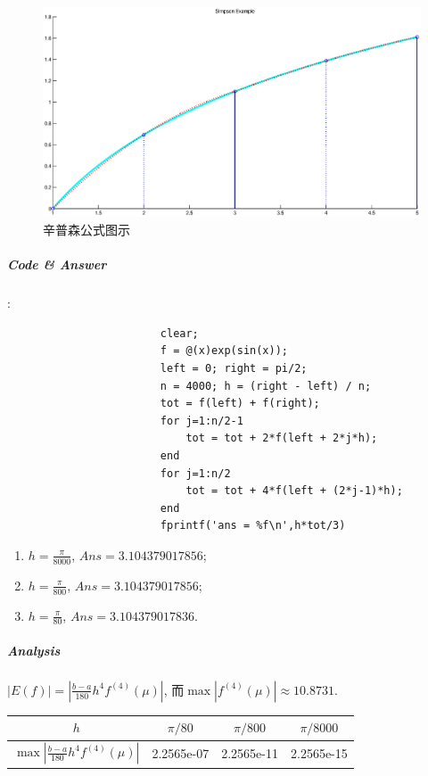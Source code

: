 \documentclass{article}
\begin{document}
\begin{CJK*}{UTF8}{song}
					 \begin{figure}[H]
					 	\centering
					 	\includegraphics[width=1.0\textwidth]{../chapter4_simpson_ts.eps}
					 	\caption{辛普森公式图示}
					 	\label{img_chapter4_simpson_ts}
					 \end{figure}
					 
				\subparagraph{Code \& Answer}
				:\newline
					\begin{lstlisting}
						clear;
						f = @(x)exp(sin(x));
						left = 0; right = pi/2;
						n = 4000; h = (right - left) / n;
						tot = f(left) + f(right);
						for j=1:n/2-1
							tot = tot + 2*f(left + 2*j*h);
						end
						for j=1:n/2
							tot = tot + 4*f(left + (2*j-1)*h);
						end
						fprintf('ans = %f\n',h*tot/3)
					\end{lstlisting}
					
					\begin{enumerate}
						\item $h = \frac{\pi}{8000}$, $Ans = 3.104379017856$;
						\item $h = \frac{\pi}{800}$, $Ans = 3.104379017856$;
						\item $h = \frac{\pi}{80}$, $Ans = 3.104379017836$.
					\end{enumerate}
				\subparagraph{Analysis}	
				$\left| E\left(f\right)\right| = \left|\frac{b-a}{180}h^4f^{\left(4\right)}\left(\mu\right) \right|$, 而$\max \left| f^{\left(4\right)}\left(\mu\right) \right| \approx 10.8731$.
				
				\begin{tabular}{|c|c|c|c|}
					\hline
					$h$    & $\pi /80$ &$\pi /800$ & $\pi /8000$ \\
					\hline
					$ \max \left| \frac{b-a}{180}h^4f^{\left(4\right)}\left(\mu\right) \right| $ &  2.2565e-07
					&  2.2565e-11 &  2.2565e-15\\
					\hline
				\end{tabular}
			

\end{CJK*}
\end{document}
